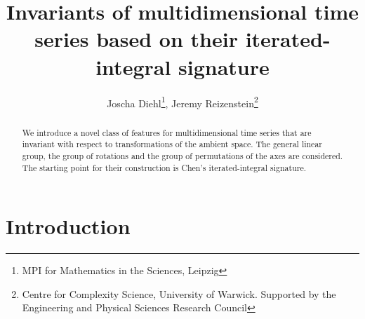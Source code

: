 \documentclass{scrartcl}
\theoremstyle{plain}
\theoremstyle{definition}
\newcommand{\1}[1]{1_{\{#1\}}}
\begin{document}
\title{Invariants of multidimensional time series based on their iterated-integral signature}
\author{Joscha Diehl\thanks{MPI for Mathematics in the Sciences, Leipzig}, Jeremy Reizenstein\thanks{Centre for Complexity Science, University of Warwick. Supported by the Engineering and Physical Sciences Research Council}}
\maketitle


\begin{abstract}
We introduce a novel class of features for multidimensional time series that are invariant with respect to transformations of the ambient space. The general linear group, the group of rotations and the group of permutations of the axes are considered. The starting point for their construction is Chen's iterated-integral signature.
\end{abstract}

\tableofcontents


\section{Introduction}

\end{document}
